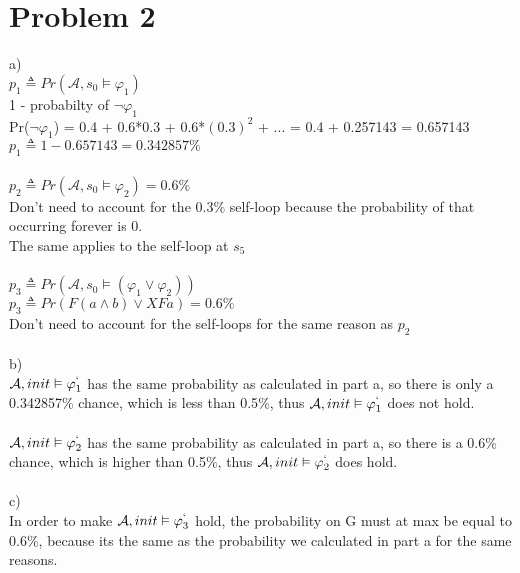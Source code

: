 \documentclass{article}
\begin{document}
\section{Problem 2}
a) \\
$p_1 \triangleq Pr(\mathcal{A}, s_0 \vDash \varphi_1)$\\
1 - probabilty of $\neg \varphi_1$ \\ 
Pr($\neg \varphi_1$) = 0.4 + 0.6*0.3 + 0.6*$(0.3)^2$ + ... = 0.4 + 0.257143 = 0.657143\\
$p_1 \triangleq 1- 0.657143 = 0.342857\%$\\
\\ $p_2 \triangleq Pr(\mathcal{A}, s_0 \vDash \varphi_2) = 0.6\%$\\
Don't need to account for the 0.3$\%$ self-loop because the probability of that occurring forever is 0.\\
The same applies to the self-loop at $s_5$\\
\\ $p_3 \triangleq Pr(\mathcal{A}, s_0 \vDash (\varphi_1 \lor \varphi_2 ))$\\
$p_3 \triangleq Pr(F(a \land b) \lor XFa) = 0.6\%$\\
Don't need to account for the self-loops for the same reason as $p_2$\\
\\ b) \\
$\mathcal{A}, init \vDash \varphi^`_1$ has the same probability as calculated in part a, so there is only a 0.342857$\%$ chance, which is less than 0.5$\%$, thus $\mathcal{A}, init \vDash \varphi^`_1$ does not hold.\\
\\ $\mathcal{A}, init \vDash \varphi^`_2$ has the same probability as calculated in part a, so there is a 0.6$\%$ chance, which is higher than 0.5$\%$, thus $\mathcal{A}, init \vDash \varphi^`_2$ does hold. \\
\\ c) \\ In order to make $\mathcal{A}, init \vDash \varphi^`_3$ hold, the probability on G must at max be equal to 0.6$\%$, because its the same as the probability we calculated in part a for the same reasons.\\
\end{document}
